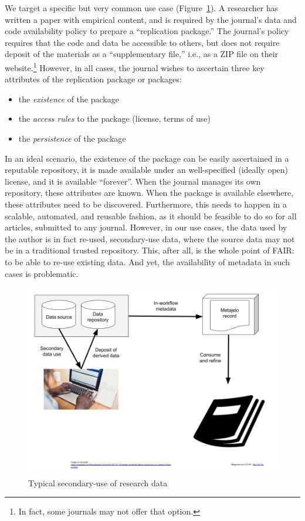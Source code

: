 We target a specific but very common use case (Figure~\ref{fig:usecase}). A researcher has written a paper with empirical content, and is required by the journal's data and code availability policy to prepare a ``replication package.'' The journal's policy requires that the code and data be accessible to others, but does not require deposit of the materials as a ``supplementary file,'' i.e., as a ZIP file on their website.\footnote{In fact, some journals may not offer that option.} However, in all cases, the journal wishes to ascertain three key attributes of the replication package or packages:
\begin{itemize}
    \item the \textit{existence} of the package
    \item the \textit{access rules} to the package (license, terms of use)
    \item the \textit{persistence} of the package
\end{itemize}
In an ideal scenario, the existence of the package can be easily ascertained in a reputable repository, it is made available under an well-specified (ideally open) license, and it is available ``forever''. When the journal manages its own repository, these attributes are known. When the package is available elsewhere, these attributes need to be discovered. Furthermore,  this needs to happen in a scalable,  automated, and reusable fashion, as it should be feasible to do so for all articles, submitted to any journal. However, in our use cases, the data used by the author is in fact re-used, secondary-use data, where the source data may not be in a traditional trusted repository. This, after all, is the whole point of FAIR: to be able to re-use existing data. And yet, the availability of metadata in such cases is problematic. 

\begin{figure}
    \centering
    \includegraphics[width=\textwidth]{text/images/metajelo drawing.png}
    \caption{Typical secondary-use of research data}
    \label{fig:usecase}
\end{figure}

